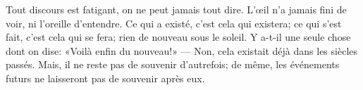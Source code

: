 Tout discours est fatigant, on ne peut jamais tout dire.
L’œil n’a jamais fini de voir, ni l’oreille d’entendre.
Ce qui a existé, c’est cela qui existera;
	ce qui s’est fait, c’est cela qui se fera;
	rien de nouveau sous le soleil.
Y a-t-il une seule chose dont on dise: «Voilà enfin du nouveau!»
	--- Non, cela existait déjà dans les siècles passés.
Mais, il ne reste pas de souvenir d’autrefois;
	de même, les événements futurs ne laisseront pas de souvenir après eux.
